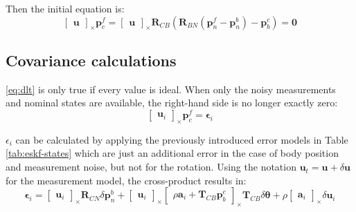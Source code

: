 Then the initial equation is:
\begin{equation}
    \begin{bmatrix}
        \mathbf{u}
    \end{bmatrix}_\times\mathbf{p}_c^f=\begin{bmatrix}
        \mathbf{u}
    \end{bmatrix}_\times\mathbf{R}_{CB}(\mathbf{R}_{BN}(\mathbf{p}_n^f-\mathbf{p}_n^b)-\mathbf{p}_b^c)=\mathbf{0}
\end{equation}
\label{eq:dlt}

\subsection{Covariance calculations}

\eqref{eq:dlt} is only true if every value is ideal. When only the noisy measurements and nominal states are available, the right-hand side is no longer exactly zero:
\begin{equation}
    \begin{bmatrix}
        \mathbf{u}_i
    \end{bmatrix}_\times\mathbf{p}_c^f=\boldsymbol{\epsilon}_i
\end{equation}

$\epsilon_i$ can be calculated by applying the previously introduced error models in Table \ref{tab:eskf-states} which are just an additional error in the case of body position and measurement noise, but not for the rotation. Using the notation $\mathbf{u}_t=\mathbf{u}+\delta\mathbf{u}$ for the measurement model, the cross-product results in:
\begin{equation}
    \boldsymbol{\epsilon}_i=\begin{bmatrix}
        \mathbf{u}_i
    \end{bmatrix}_\times\mathbf{R}_{CN}\delta\mathbf{p}_n^b +
    \begin{bmatrix}
        \mathbf{u}_i
    \end{bmatrix}_\times
    \begin{bmatrix}
    \rho\mathbf{a}_i+\mathbf{T}_{CB}\mathbf{p}_b^c
    \end{bmatrix}_\times\mathbf{T}_{CB}\delta\boldsymbol{\theta}+\rho\begin{bmatrix}
        \mathbf{a}_i
    \end{bmatrix}_\times\delta\mathbf{u}_i
    \label{eq:eps}
\end{equation}


